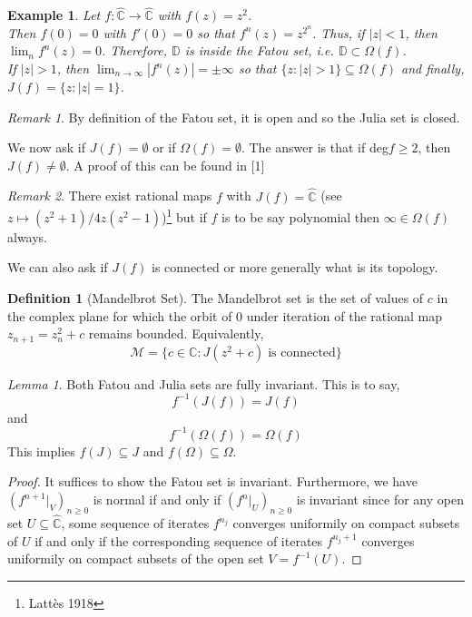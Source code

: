 \documentclass[a4paper, 11pt]{book}
\newtheorem*{example}{Example}
\theoremstyle{definition}
\newtheorem{definition}{Definition}[section]
\theoremstyle{remark}
\newtheorem*{remark}{Remark}
\newtheorem{lemma}[theorem]{Lemma}
\begin{document}
    \begin{example}
        Let $f:\hat{\mathbb{C}}\to\hat{\mathbb{C}}$ with $f(z) = z^2$.\\

        Then $f(0) = 0$ with $f'(0) = 0$ so that $f^n(z) = z^{2^n}$. Thus, if $|z|<1$, then $\lim_n f^n(z) = 0$. Therefore,
        $\mathbb{D}$ is inside the Fatou set, i.e. $\mathbb{D}\subset\Omega(f)$.\\

        If $|z|>1$, then $\lim_{n\to\infty} |f^n(z)| = \pm\infty$ so that $\{z:|z|>1\}\subseteq\Omega(f)$ and finally,
        $J(f) = \{z: |z|=1\}$.
    \end{example}

    \begin{remark}
        By definition of the Fatou set, it is open and so the Julia set is closed.
    \end{remark}

    We now ask if $J(f) = \emptyset$ or if $\Omega(f)=\emptyset$. The answer is that if deg$f\geq 2$, then $J(f)\neq\emptyset$. A
    proof of this can be found in [1] 
    
    \begin{remark}
        There exist rational maps $f$ with $J(f) = \hat{\mathbb{C}}$ (see $z\mapsto (z^2+1)/4z(z^2-1)$)\footnote{Lattès 1918} but
        if $f$ is to be say polynomial then $\infty\in \Omega(f)$ always.
    \end{remark}

    We can also ask if $J(f)$ is connected or more generally what is its topology.

    \begin{definition}[Mandelbrot Set]
        The Mandelbrot set is the set of values of $c$ in the complex plane for which the orbit of 0 under iteration of the rational
        map $z_{n+1} = z_n^2 + c$ remains bounded. Equivalently,
        \[ \mathcal{M} = \{c\in\mathbb{C}: J(z^2+c)\;\text{is connected}\} \]
    \end{definition}

    \begin{lemma}
        Both Fatou and Julia sets are fully invariant. This is to say,
        \[ f^{-1}(J(f)) = J(f) \]
        and
        \[ f^{-1}(\Omega(f)) = \Omega(f) \]
        This implies $f(J)\subseteq J$ and $f(\Omega)\subseteq \Omega$.
    \end{lemma}
    \begin{proof}
        It suffices to show the Fatou set is invariant. Furthermore, we have $(f^{n+1}|_V)_{n\geq 0}$ is normal if and only if
        $(f^n|_U)_{n\geq 0}$ is invariant since for any open set $U\subseteq\hat{\mathbb{C}}$, some sequence of iterates $f^{n_j}$
        converges uniformily on compact subsets of $U$ if and only if the corresponding sequence of iterates $f^{n_j+1}$ converges
        uniformily on compact subsets of the open set $V = f^{-1}(U)$.
    \end{proof}
\end{document}
